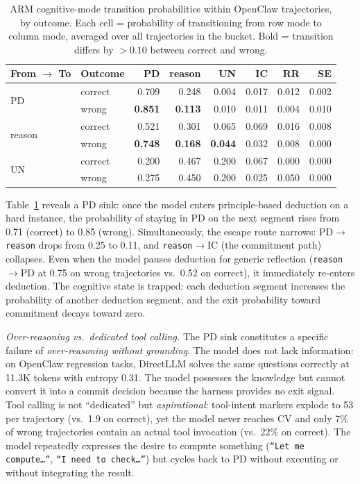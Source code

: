 \begin{table}[t]
\centering
\small
\caption{%
  ARM cognitive-mode transition probabilities within OpenClaw trajectories,
  by outcome.
  Each cell = probability of transitioning from row mode to column mode,
  averaged over all trajectories in the bucket.
  Bold = transition differs by $>0.10$ between correct and wrong.
}
\label{tab:gpqa-arm-transitions-full}
\setlength{\tabcolsep}{2.5pt}
\begin{tabular}{llrrrrrr}
\toprule
From $\to$ To & Outcome & PD & reason & UN & IC & RR & SE \\
\midrule
\multirow{2}{*}{PD}
  & correct & 0.709 & 0.248 & 0.004 & 0.017 & 0.012 & 0.002 \\
  & wrong   & \textbf{0.851} & \textbf{0.113} & 0.010 & 0.011 & 0.004 & 0.010 \\
\midrule
\multirow{2}{*}{reason}
  & correct & 0.521 & 0.301 & 0.065 & 0.069 & 0.016 & 0.008 \\
  & wrong   & \textbf{0.748} & \textbf{0.168} & \textbf{0.044} & 0.032 & 0.008 & 0.000 \\
\midrule
\multirow{2}{*}{UN}
  & correct & 0.200 & 0.467 & 0.200 & 0.067 & 0.000 & 0.000 \\
  & wrong   & 0.275 & 0.450 & 0.200 & 0.025 & 0.050 & 0.000 \\
\bottomrule
\end{tabular}
\end{table}

Table~\ref{tab:gpqa-arm-transitions-full} reveals a PD sink: once the model
enters principle-based deduction on a hard instance, the probability of staying
in PD on the next segment rises from 0.71 (correct) to 0.85 (wrong).
Simultaneously, the escape route narrows: PD$\to$\texttt{reason} drops from
0.25 to 0.11, and \texttt{reason}$\to$IC (the commitment path) collapses.
Even when the model pauses deduction for generic reflection
(\texttt{reason}$\to$PD at 0.75 on wrong trajectories vs.\ 0.52 on correct),
it immediately re-enters deduction.
The cognitive state is trapped: each deduction segment increases the probability
of another deduction segment, and the exit probability toward commitment decays
toward zero.

\emph{Over-reasoning vs.\ dedicated tool calling.}
The PD sink constitutes a specific failure of \emph{over-reasoning without
grounding}.
The model does not lack information: on OpenClaw regression tasks, DirectLLM
solves the same questions correctly at 11.3K tokens with entropy 0.31.
The model possesses the knowledge but cannot convert it into a commit decision
because the harness provides no exit signal.
Tool calling is not ``dedicated'' but \emph{aspirational}: tool-intent markers
explode to 53 per trajectory (vs.\ 1.9 on correct), yet the model never reaches
CV and only 7\% of wrong trajectories contain an actual tool invocation (vs.\
22\% on correct).
The model repeatedly expresses the desire to compute something
(\texttt{``Let me compute\ldots''}, \texttt{``I need to check\ldots''}) but
cycles back to PD without executing or without integrating the result.


